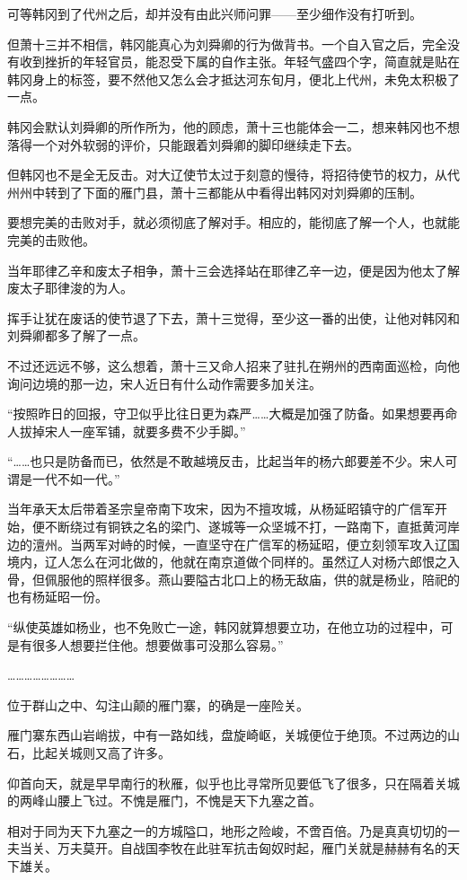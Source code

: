 可等韩冈到了代州之后，却并没有由此兴师问罪——至少细作没有打听到。

但萧十三并不相信，韩冈能真心为刘舜卿的行为做背书。一个自入官之后，完全没有收到挫折的年轻官员，能忍受下属的自作主张。年轻气盛四个字，简直就是贴在韩冈身上的标签，要不然他又怎么会才抵达河东旬月，便北上代州，未免太积极了一点。

韩冈会默认刘舜卿的所作所为，他的顾虑，萧十三也能体会一二，想来韩冈也不想落得一个对外软弱的评价，只能跟着刘舜卿的脚印继续走下去。

但韩冈也不是全无反击。对大辽使节太过于刻意的慢待，将招待使节的权力，从代州州中转到了下面的雁门县，萧十三都能从中看得出韩冈对刘舜卿的压制。

要想完美的击败对手，就必须彻底了解对手。相应的，能彻底了解一个人，也就能完美的击败他。

当年耶律乙辛和废太子相争，萧十三会选择站在耶律乙辛一边，便是因为他太了解废太子耶律浚的为人。

挥手让犹在废话的使节退了下去，萧十三觉得，至少这一番的出使，让他对韩冈和刘舜卿都多了解了一点。

不过还远远不够，这么想着，萧十三又命人招来了驻扎在朔州的西南面巡检，向他询问边境的那一边，宋人近日有什么动作需要多加关注。

“按照昨日的回报，守卫似乎比往日更为森严……大概是加强了防备。如果想要再命人拔掉宋人一座军铺，就要多费不少手脚。”

“……也只是防备而已，依然是不敢越境反击，比起当年的杨六郎要差不少。宋人可谓是一代不如一代。”

当年承天太后带着圣宗皇帝南下攻宋，因为不擅攻城，从杨延昭镇守的广信军开始，便不断绕过有铜铁之名的梁门、遂城等一众坚城不打，一路南下，直抵黄河岸边的澶州。当两军对峙的时候，一直坚守在广信军的杨延昭，便立刻领军攻入辽国境内，辽人怎么在河北做的，他就在南京道做个同样的。虽然辽人对杨六郎恨之入骨，但佩服他的照样很多。燕山要隘古北口上的杨无敌庙，供的就是杨业，陪祀的也有杨延昭一份。

“纵使英雄如杨业，也不免败亡一途，韩冈就算想要立功，在他立功的过程中，可是有很多人想要拦住他。想要做事可没那么容易。”

……………………

位于群山之中、勾注山颠的雁门寨，的确是一座险关。

雁门寨东西山岩峭拔，中有一路如线，盘旋崎岖，关城便位于绝顶。不过两边的山石，比起关城则又高了许多。

仰首向天，就是早早南行的秋雁，似乎也比寻常所见要低飞了很多，只在隔着关城的两峰山腰上飞过。不愧是雁门，不愧是天下九塞之首。

相对于同为天下九塞之一的方城隘口，地形之险峻，不啻百倍。乃是真真切切的一夫当关、万夫莫开。自战国李牧在此驻军抗击匈奴时起，雁门关就是赫赫有名的天下雄关。

